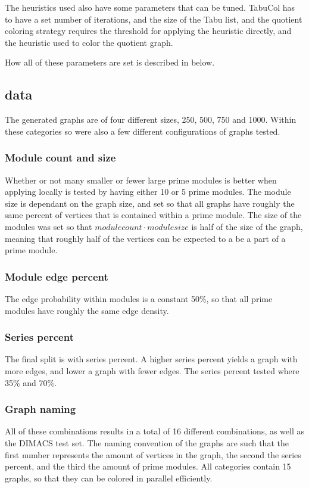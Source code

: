 \documentclass[a4paper]{article}
\begin{document}
The heuristics used also have some parameters that can be tuned. TabuCol has to
have a set number of iterations, and the size of the Tabu list, and the quotient
coloring strategy requires the threshold for applying the heuristic directly,
and the heuristic used to color the quotient graph.


How all of these parameters are set is described in below.

\subsection{data}

The generated graphs are of four different sizes, 250, 500, 750 and 1000. 
Within these categories so were also a few different configurations of graphs
tested. 

\subsubsection{Module count and size}
Whether or not many smaller or fewer large prime modules is better when
applying locally is tested by having either 10 or 5 prime modules. 
The module size is dependant on the graph size, and set so that all graphs 
have roughly the same percent of vertices that is contained within a prime
module. The size of the modules was set 
so that $module count \cdot module size$ is half of the size of the graph,
meaning that roughly half of the vertices can be expected to a be a part of a 
prime module.

\subsubsection{Module edge percent}
The edge probability within modules is a  constant 50\%, so that all
prime modules have roughly the same edge density. 

\subsubsection{Series percent}
The final split is with series percent. A higher series percent yields a graph
with more edges, and lower a graph with fewer  edges. The series percent tested
where 35\% and 70\%.

\subsubsection{Graph naming}
All of these combinations results in a total of 16 different combinations, as well
as the DIMACS test set. The naming convention of the graphs are such that the
first number represents the amount of vertices in the graph, the second the series percent, and the third
the amount of prime modules. All categories contain 15 graphs, so that they can
be colored in parallel efficiently.
\end{document}
